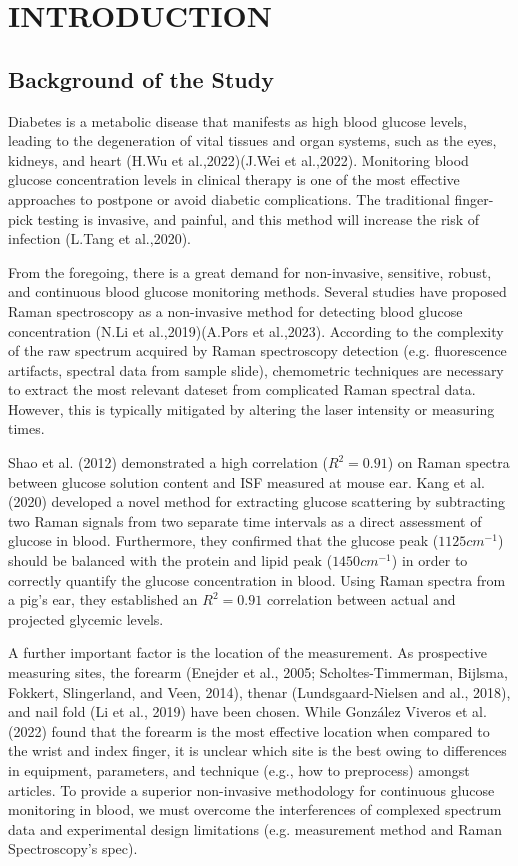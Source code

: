 \chapter{INTRODUCTION} 

\section{Background of the Study}

Diabetes is a metabolic disease that manifests as high blood glucose levels, leading to the degeneration of vital tissues and organ systems, such as the eyes, kidneys, and heart (H.Wu et al.,2022)(J.Wei et al.,2022). Monitoring blood glucose concentration levels in clinical therapy is one of the most effective approaches to postpone or avoid diabetic complications. The traditional finger-pick testing is invasive, and painful, and this method will increase the risk of infection (L.Tang et al.,2020). 

From the foregoing, there is a great demand for non-invasive, sensitive, robust, and continuous blood glucose monitoring methods. Several studies have proposed Raman spectroscopy as a non-invasive method for detecting blood glucose concentration (N.Li et al.,2019)(A.Pors et al.,2023). According to the complexity of the raw spectrum acquired by Raman spectroscopy detection (e.g. fluorescence artifacts, spectral data from sample slide), chemometric techniques are necessary to extract the most relevant dateset from complicated Raman spectral data. However, this is typically mitigated by altering the laser intensity or measuring times.

Shao et al. (2012) demonstrated a high correlation ($R^2 = 0.91$) on Raman spectra between glucose solution content and ISF measured at mouse ear. Kang et al. (2020) developed a novel method for extracting glucose scattering by subtracting two Raman signals from two separate time intervals as a direct assessment of glucose in blood. Furthermore, they confirmed that the glucose peak ($1125cm^{-1}$) should be balanced with the protein and lipid peak ($1450cm^{-1}$) in order to correctly quantify the glucose concentration in blood. Using Raman spectra from a pig's ear, they established an $R^2 = 0.91$ correlation between actual and projected glycemic levels.

A further important factor is the location of the measurement. As prospective measuring sites, the forearm (Enejder et al., 2005; Scholtes-Timmerman, Bijlsma, Fokkert, Slingerland, and Veen, 2014), thenar (Lundsgaard-Nielsen and al., 2018), and nail fold (Li et al., 2019) have been chosen. While González Viveros et al. (2022) found that the forearm is the most effective location when compared to the wrist and index finger, it is unclear which site is the best owing to differences in equipment, parameters, and technique (e.g., how to preprocess) amongst articles. To provide a superior non-invasive methodology for continuous glucose monitoring in blood, we must overcome the interferences of complexed spectrum data and experimental design limitations (e.g. measurement method and Raman Spectroscopy's spec).

